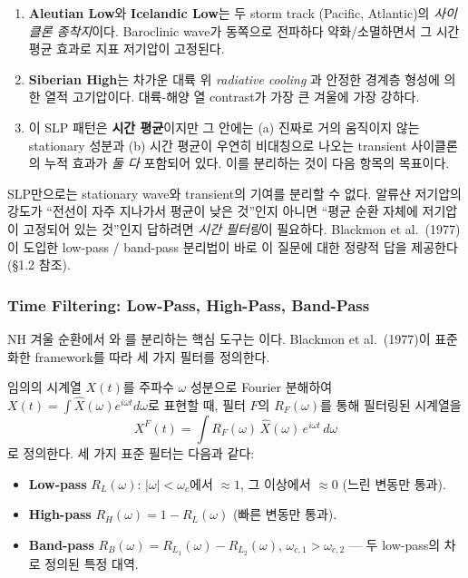 \begin{enumerate}
  \item \textbf{Aleutian Low}와 \textbf{Icelandic Low}는 두 storm track
        (Pacific, Atlantic)의 \textit{사이클론 종착지}이다.  Baroclinic
        wave가 동쪽으로 전파하다 약화/소멸하면서 그 시간 평균 효과로
        지표 저기압이 고정된다.
  \item \textbf{Siberian High}는 차가운 대륙 위 \textit{radiative cooling}
        과 안정한 경계층 형성에 의한 열적 고기압이다.  대륙-해양 열
        contrast가 가장 큰 겨울에 가장 강하다.
  \item 이 SLP 패턴은 \textbf{시간 평균}이지만 그 안에는 (a) 진짜로 거의
        움직이지 않는 stationary 성분과 (b) 시간 평균이 우연히 비대칭으로
        나오는 transient 사이클론의 누적 효과가 \textit{둘 다} 포함되어
        있다.  이를 분리하는 것이 다음 항목의 목표이다.
\end{enumerate}

\begin{hisublock}
SLP만으로는 stationary wave와 transient의 기여를 분리할 수 없다.  알류샨
저기압의 강도가 ``전선이 자주 지나가서 평균이 낮은 것''인지 아니면 ``평균
순환 자체에 저기압이 고정되어 있는 것''인지 답하려면 \textit{시간 필터링}이
필요하다.  Blackmon et al.\ (1977)이 도입한 low-pass / band-pass 분리법이
바로 이 질문에 대한 정량적 답을 제공한다 (§1.2 참조).
\end{hisublock}

\subsubsection{Time Filtering: Low-Pass, High-Pass, Band-Pass}

NH 겨울 순환에서 와 를
분리하는 핵심 도구는 이다.  Blackmon et al.\ (1977)이
표준화한 framework를 따라 세 가지 필터를 정의한다.

\begin{definition}
임의의 시계열 $X(t)$를 주파수 $\omega$ 성분으로 Fourier 분해하여
$X(t) = \int \widehat{X}(\omega)e^{i\omega t}d\omega$로 표현할 때, 필터 $F$의
 $R_F(\omega)$를 통해 필터링된 시계열을
\begin{equation}\label{eq:ch06_nh_filter_def}
  X^F(t) = \int R_F(\omega)\,\widehat{X}(\omega)\,e^{i\omega t}\,d\omega
\end{equation}
로 정의한다.  세 가지 표준 필터는 다음과 같다:
\begin{itemize}
  \item \textbf{Low-pass} $R_L(\omega)$: $|\omega| < \omega_c$에서 $\approx 1$,
        그 이상에서 $\approx 0$ (느린 변동만 통과).
  \item \textbf{High-pass} $R_H(\omega) = 1 - R_L(\omega)$ (빠른 변동만 통과).
  \item \textbf{Band-pass} $R_B(\omega) = R_{L_1}(\omega) - R_{L_2}(\omega)$,
        $\omega_{c,1} > \omega_{c,2}$ — 두 low-pass의 차로 정의된 특정 대역.
\end{itemize}
\end{definition}

